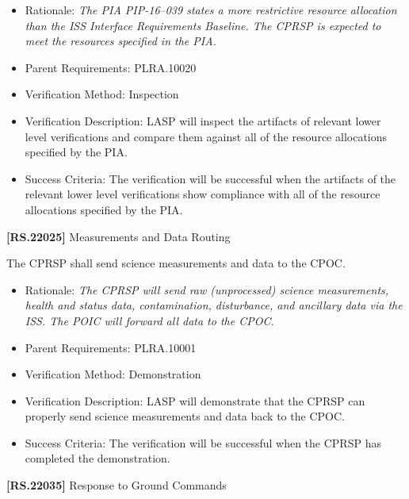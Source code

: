 \documentclass[12pt,oneside,oldfontcommands]{memoir}
\begin{document}
\begin{itemize}
\item{} Rationale: \emph{The PIA PIP-16--039 states a more restrictive resource allocation than the ISS Interface Requirements Baseline. The CPRSP is expected to meet the resources specified in the PIA.}

\item{} Parent Requirements: PLRA.10020

\item{} Verification Method: Inspection

\item{} Verification Description: \gls{LASP} will inspect the artifacts of relevant lower level verifications and compare them against all of the resource allocations specified by the \gls{PIA}.

\item{} Success Criteria: The verification will be successful when the artifacts of the relevant lower level verifications show compliance with all of the resource allocations specified by the \gls{PIA}.

\end{itemize}

\textbf{[RS.22025]} Measurements and Data Routing

The \gls{CPRSP} shall send science \gls{measure}ments and data to the \gls{CPOC}.

\begin{itemize}
\item{} Rationale: \emph{The CPRSP will send raw (unprocessed) science measurements, health and status data, contamination, disturbance, and ancillary data via the ISS. The POIC will forward all data to the CPOC.}

\item{} Parent Requirements: PLRA.10001

\item{} Verification Method: Demonstration

\item{} Verification Description: \gls{LASP} will demonstrate that the \gls{CPRSP} can properly send science \gls{measure}ments and data back to the \gls{CPOC}.

\item{} Success Criteria: The verification will be successful when the \gls{CPRSP} has completed the \gls{demonstration}.

\end{itemize}

\textbf{[RS.22035]} Response to Ground Commands
\end{document}
